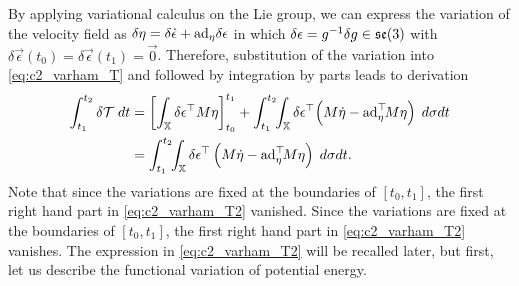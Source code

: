 \noindent By applying variational calculus on the Lie group, we can express the variation of the velocity field as $\delta{\eta} = \delta \dot{{\epsilon}} + \text{ad}_{{\eta}} \delta {\epsilon}$ in which $\delta {\epsilon} = g^{-1} \delta g \in {\mathfrak{se}(3)}$ with $\delta \vec{\epsilon}(t_0) = \delta \vec{\epsilon}(t_1) = \vec{0}$. Therefore, substitution of the variation into \eqref{eq:c2_varham_T} and followed by integration by parts leads to derivation
\begin{align}
\int_{t_1}^{t_2} \delta\mathcal{T} \; dt& = 
\left[ \int_{\mathbb{X}} \delta {\epsilon}^\top {M} {\eta} \right]_{t_0}^{t_1} +  \int_{t_1}^{t_2} \!\! \int_{\mathbb{X}}  \delta {\epsilon}^\top \! \left( M\dot{{\eta}} - \text{ad}_{{\eta}}^\top \! M {\eta}\right)\; d\sigma dt \notag \\ 
& = \int_{t_1}^{t_2} \!\! \int_{\mathbb{X}} \delta {\epsilon}^\top \left( M\dot{{\eta}} - \text{ad}_{{\eta}}^\top \! M {\eta}\right)\; d\sigma dt\label{eq:c2_varham_T2}.
\end{align}
Note that since the variations are fixed at the boundaries of $[t_0,t_1]$, the first right hand part in \eqref{eq:c2_varham_T2} vanished. Since the variations are fixed at the boundaries of $[t_0,t_1]$, the first right hand part in \eqref{eq:c2_varham_T2} vanishes. The expression in \eqref{eq:c2_varham_T2} will be recalled later, but first, let us describe the functional variation of potential energy. 

